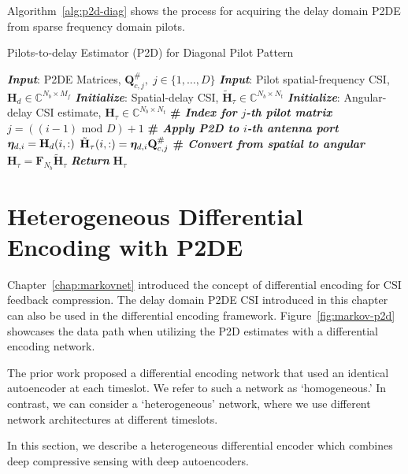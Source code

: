 Algorithm~\ref{alg:p2d-diag} shows the process for acquiring the delay domain P2DE from sparse frequency domain pilots.

\begin{algorithm}
    \caption{Pilots-to-delay Estimator (P2D) for Diagonal Pilot Pattern} 
    \label{alg:p2d-diag}
    \begin{algorithmic}[1]
    \State \textbf{\emph{Input}}:
        P2DE Matrices, $\mathbf{Q}_{c,j}^\#,\;
        j\in\{1,\dots, D\}$
    \State \textbf{\emph{Input}}: Pilot spatial-frequency CSI, $\mathbf{H}_d\in\mathbb{C}^{N_b\times M_f}$
    \State \textbf{\emph{Initialize}}: Spatial-delay CSI, $\tilde{\mathbf{H}}_\tau\in\mathbb{C}^{N_b\times N_t}$
   \State \textbf{\emph{Initialize}}: Angular-delay CSI estimate, ${\mathbf{H}}_\tau
              \in\mathbb{C}^{N_b\times N_t}$
        \State \textbf{\# \emph{Index for $j$-th pilot matrix}}
        \State $j = ((i-1) \text{ mod } D) + 1$
        \State \textbf{\# \emph{Apply P2D to $i$-th antenna port}}
        \State ${\boldsymbol{\eta}}_{d,i} = \mathbf{H}_d(i,:)$
        \State $\tilde{{\mathbf{H}}}_{\tau}(i,:) = {\boldsymbol{\eta}}_{d,i}\mathbf{Q}^{\#}_{c,j}$
        \EndFor
        \State \textbf{\# \emph{Convert from spatial to angular}}
        \State ${{\mathbf{H}}}_{\tau}=\mathbf{F}_{N_b}\tilde{{\mathbf{H}}}_{\tau}$
        \State \textbf{\emph{Return}} ${{\mathbf{H}}}_{\tau}$
    \end{algorithmic} 
\end{algorithm}

\section{Heterogeneous Differential Encoding with P2DE}
\label{sect:hetero-markov}

Chapter~\ref{chap:markovnet} introduced the concept of differential encoding for CSI feedback compression. The delay domain P2DE CSI introduced in this chapter can also be used in the differential encoding framework. Figure~\ref{fig:markov-p2d} showcases the data path when utilizing the P2D estimates with a differential encoding network.

The prior work proposed a differential encoding network that used an identical autoencoder at each timeslot. We refer to such a network as `homogeneous.' In contrast, we can consider a `heterogeneous' network, where we use different network architectures at different timeslots.

In this section, we describe a heterogeneous differential encoder which combines deep compressive sensing with deep autoencoders.

